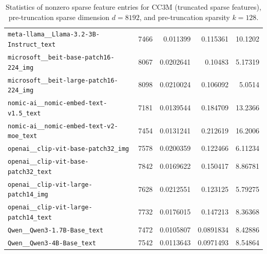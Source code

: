 \begin{table}[htbp]
{\begin{tabular}{lrrrr}
\texttt{meta-llama\_\_Llama-3.2-3B-Instruct\_text} & 7466 & 0.011399 & 0.115361 & 10.1202 \\
\texttt{microsoft\_\_beit-base-patch16-224\_img} & 8067 & 0.0202641 & 0.10483 & 5.17319 \\
\texttt{microsoft\_\_beit-large-patch16-224\_img} & 8098 & 0.0210024 & 0.106092 & 5.0514 \\
\texttt{nomic-ai\_\_nomic-embed-text-v1.5\_text} & 7181 & 0.0139544 & 0.184709 & 13.2366 \\
\texttt{nomic-ai\_\_nomic-embed-text-v2-moe\_text} & 7454 & 0.0131241 & 0.212619 & 16.2006 \\
\texttt{openai\_\_clip-vit-base-patch32\_img} & 7578 & 0.0200359 & 0.122466 & 6.11234 \\
\texttt{openai\_\_clip-vit-base-patch32\_text} & 7842 & 0.0169622 & 0.150417 & 8.86781 \\
\texttt{openai\_\_clip-vit-large-patch14\_img} & 7628 & 0.0212551 & 0.123125 & 5.79275 \\
\texttt{openai\_\_clip-vit-large-patch14\_text} & 7732 & 0.0176015 & 0.147213 & 8.36368 \\
\texttt{Qwen\_\_Qwen3-1.7B-Base\_text} & 7472 & 0.0105807 & 0.0891834 & 8.42886 \\
\texttt{Qwen\_\_Qwen3-4B-Base\_text} & 7542 & 0.0113643 & 0.0971493 & 8.54864 \\
\bottomrule
\end{tabular}
}%
\caption{Statistics of nonzero sparse feature entries for CC3M (truncated sparse features), pre-truncation sparse dimension $d=8192$, and pre-truncation sparsity $k=128$.}
\label{tab:sparse-feature-entries-cc3m-truncated-d8192-k128}
\end{table}
